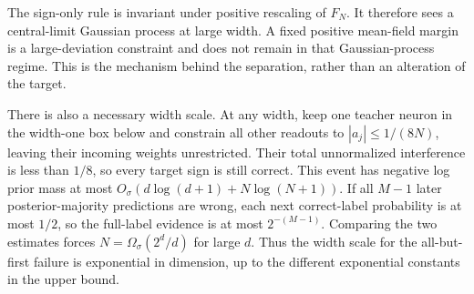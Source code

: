 \documentclass[11pt]{article}
\begin{document}
The sign-only rule is invariant under positive rescaling of $F_N$.
It therefore sees a central-limit Gaussian process at large width.
A fixed positive mean-field margin is a large-deviation constraint and
does not remain in that Gaussian-process regime. This is the mechanism
behind the separation, rather than an alteration of the target.

There is also a necessary width scale. At any width, keep one teacher
neuron in the width-one box below and constrain all other readouts to
$|a_j|\le1/(8N)$, leaving their incoming weights unrestricted. Their
total unnormalized interference is less than $1/8$, so every target sign
is still correct. This event has negative log prior mass at most
$O_\sigma(d\log(d+1)+N\log(N+1))$. If all $M-1$ later posterior-majority
predictions are wrong, each next correct-label probability is at most
$1/2$, so the full-label evidence is at most $2^{-(M-1)}$. Comparing
the two estimates forces $N=\Omega_\sigma(2^d/d)$ for large $d$.
Thus the width scale for the all-but-first failure is exponential in
dimension, up to the different exponential constants in the upper bound.
\end{document}
